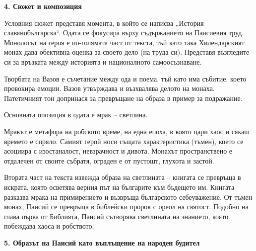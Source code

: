 \documentclass[12pt,a4paper]{article}
\begin{document}
\textbf{4. Сюжет и композиция}
\vspace{0.1cm}
 
\indent Условния сюжет представя момента, в който се написва „История славянобългарска“.  Одата се фокусира върху съдържанието на Паисиевия труд. Монологът на героя е по-голямата част от текста, тъй като така Хилендарският монах дава обективна оценка за своето дело (на труда си). Представя възгледите си за връзката между историята и националното самоосъзнаване.
\vspace{0.1cm}
 
\indent Творбата на Вазов е съчетание между ода и поема, тъй като има събитие, което провокира емоции. Вазов утвърждава и възхвалява делото на монаха. Патетичният тон допринася за превръщане на образа в пример за подражание.
\vspace{0.1cm}
 
\indent Основната опозиция в одата е мрак – светлина. 
\vspace{0.1cm}
 
\indent Мракът е метафора на робското време, на една епоха, в която цари хаос и сякаш времето е спряло. Самият герой носи същата характеристика (тъмен), което се асоциира с изостаналост, невзрачност и дивота. Монахът пространствено е отдалечен от своите събратя, ограден е от пустошт, глухота и застой.
\vspace{0.1cm}
 
\indent Втората част на текста извежда образа на светлината – книгата се превръща в искрата, която осветява верния път на българите към бъдещето им. Книгата разказва мрака на примирението и възвръща българското себеуважение. От тъмен монах, Паисий се превръща в библейски пророк с ореол на святост. Подобно на глава първа от Библията, Паисий сътворява светлината на знанието, която побеждава хаоса и робството.
\vspace{0.1cm}
 
\textbf{5. Образът на Паисий като въплъщение на народен будител}
\vspace{0.1cm}
 
\end{document}
